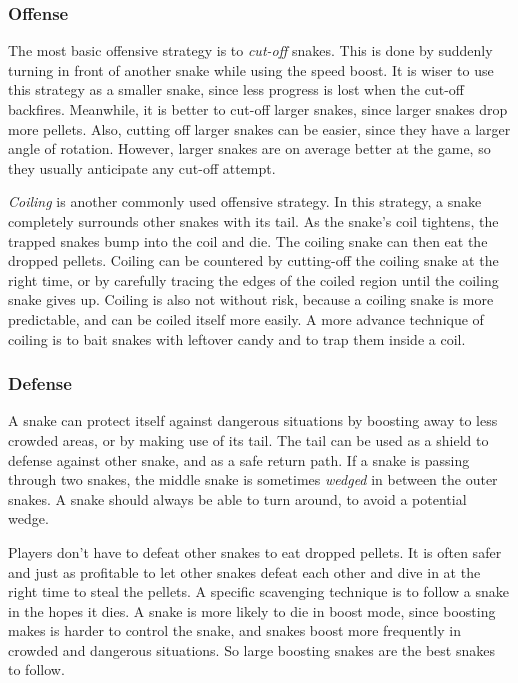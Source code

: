 \subsubsection*{Offense}
The most basic offensive strategy is to \textit{cut-off} snakes. This is done by suddenly turning in front of another snake while using the speed boost. It is wiser to use this strategy as a smaller snake, since less progress is lost when the cut-off backfires. Meanwhile, it is better to cut-off larger snakes, since larger snakes drop more pellets. Also, cutting off larger snakes can be easier, since they have a larger angle of rotation. However, larger snakes are on average better at the game, so they usually anticipate any cut-off attempt.

\textit{Coiling} is another commonly used offensive strategy. In this strategy, a snake completely surrounds other snakes with its tail. As the snake's coil tightens, the trapped snakes bump into the coil and die. The coiling snake can then eat the dropped pellets. Coiling can be countered by cutting-off the coiling snake at the right time, or by carefully tracing the edges of the coiled region until the coiling snake gives up. Coiling is also not without risk, because a coiling snake is more predictable, and can be coiled itself more easily. A more advance technique of coiling is to bait snakes with leftover candy and to trap them inside a coil.

\subsubsection*{Defense}

A snake can protect itself against dangerous situations by boosting away to less crowded areas, or by making use of its tail. The tail can be used as a shield to defense against other snake, and as a safe return path. If a snake is passing through two snakes, the middle snake is sometimes \textit{wedged} in between the outer snakes. A snake should always be able to turn around, to avoid a potential wedge. 

Players don't have to defeat other snakes to eat dropped pellets. It is often safer and just as profitable to let other snakes defeat each other and dive in at the right time to steal the pellets. A specific scavenging technique is to follow a snake in the hopes it dies. A snake is more likely to die in boost mode, since boosting makes is harder to control the snake, and snakes boost more frequently in crowded and dangerous situations. So large boosting snakes are the best snakes to follow. 



